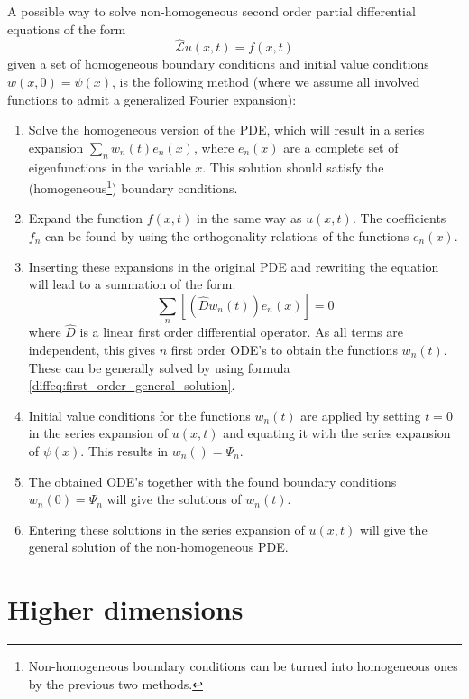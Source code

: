 	\begin{method}
		A possible way to solve non-homogeneous second order partial differential equations of the form \[\hat{\mathcal{L}}u(x, t) = f(x, t)\] given a set of homogeneous boundary conditions and initial value conditions $w(x, 0) = \psi(x)$, is the following method (where we assume all involved functions to admit a generalized Fourier expansion):
		\begin{enumerate}
			\item Solve the homogeneous version of the PDE, which will result in a series expansion $\sum_nw_n(t)e_n(x)$, where $e_n(x)$ are a complete set of eigenfunctions in the variable $x$. This solution should satisfy the (homogeneous\footnote{Non-homogeneous boundary conditions can be turned into homogeneous ones by the previous two methods.}) boundary conditions.
			\item Expand the function $f(x, t)$ in the same way as $u(x, t)$. The coefficients $f_n$ can be found by using the orthogonality relations of the functions $e_n(x)$.
			\item Inserting these expansions in the original PDE and rewriting the equation will lead to a summation of the form: \[\sum_n\left[\left(\hat{D}w_n(t)\right)e_n(x)\right] = 0\] where $\hat{D}$ is a linear first order differential operator. As all terms are independent, this gives $n$ first order ODE's to obtain the functions $w_n(t)$. These can be generally solved by using formula \ref{diffeq:first_order_general_solution}.
			\item Initial value conditions for the functions $w_n(t)$ are applied by setting $t=0$ in the series expansion of $u(x, t)$ and equating it with the series expansion of $\psi(x)$. This results in $w_n() = \Psi_n$.
			\item The obtained ODE's together with the found boundary conditions $w_n(0) = \Psi_n$ will give the solutions of $w_n(t)$.
			\item Entering these solutions in the series expansion of $u(x, t)$ will give the general solution of the non-homogeneous PDE.
		\end{enumerate}
	\end{method}

\section{Higher dimensions}\label{pde:section:higher_dimensions}

